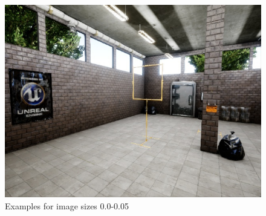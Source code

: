\documentclass{article}
\begin{document}
\begin{figure}[htbp]
\begin{minipage}{0.3\linewidth}
		\includegraphics[width=\linewidth]{size_examples/001-005 (6).jpg}
	\end{minipage}
	\caption{Examples for image sizes 0.0-0.05}
	\label{fig:examples}
\end{figure}
\end{document}

